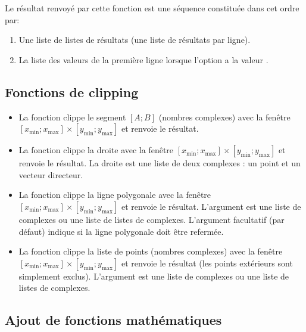 Le résultat renvoyé par cette fonction est une séquence constituée dans cet ordre par:
    \begin{enumerate}
        \item Une liste de listes de résultats (une liste de résultats par ligne).
        \item La liste des valeurs de la première ligne lorsque l'option  a la valeur \true.
    \end{enumerate}


\subsection{Fonctions de clipping}

\begin{itemize}
    \item La fonction  clippe le segment $[A;B]$ (nombres complexes) avec la fenêtre $[x_{\mathrm{min}};x_{\mathrm{max}}]\times [y_{\mathrm{min}};y_{\mathrm{max}}]$ et renvoie le résultat.
    
    \item La fonction  clippe la droite  avec la fenêtre $[x_{\mathrm{min}};x_{\mathrm{max}}]\times [y_{\mathrm{min}};y_{\mathrm{max}}]$ et renvoie le résultat. La droite  est une liste de deux complexes : un point et un vecteur directeur.
    
    \item La fonction  clippe la ligne polygonale  avec la fenêtre $[x_{\mathrm{min}};x_{\mathrm{max}}]\times [y_{\mathrm{min}};y_{\mathrm{max}}]$ et renvoie le résultat. L'argument  est une liste de complexes ou une liste de listes de complexes. L'argument facultatif  (\false par défaut) indique si la ligne polygonale doit être refermée.
    
    \item La fonction  clippe la liste de points (nombres complexes)  avec la fenêtre $[x_{\mathrm{min}};x_{\mathrm{max}}]\times [y_{\mathrm{min}};y_{\mathrm{max}}]$ et renvoie le résultat (les points extérieurs sont simplement exclus). L'argument  est une liste de complexes ou une liste de listes de complexes.
\end{itemize}

\subsection{Ajout de fonctions mathématiques}

